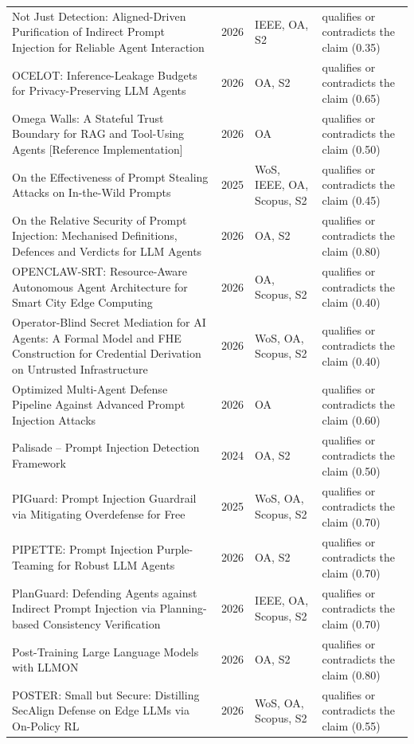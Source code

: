 \begin{longtable}{@{}%
  >{\raggedright\arraybackslash}p{}c%
  >{\raggedright\arraybackslash}p{}%
  >{\raggedright\arraybackslash}p{}@{}}
Not Just Detection: Aligned-Driven Purification of Indirect Prompt Injection for Reliable Agent Interaction & 2026 & IEEE, OA, S2 & qualifies or contradicts the claim (0.35) \\
OCELOT: Inference-Leakage Budgets for Privacy-Preserving LLM Agents & 2026 & OA, S2 & qualifies or contradicts the claim (0.65) \\
Omega Walls: A Stateful Trust Boundary for RAG and Tool-Using Agents [Reference Implementation] & 2026 & OA & qualifies or contradicts the claim (0.50) \\
On the Effectiveness of Prompt Stealing Attacks on In-the-Wild Prompts & 2025 & WoS, IEEE, OA, Scopus, S2 & qualifies or contradicts the claim (0.45) \\
On the Relative Security of Prompt Injection: Mechanised Definitions, Defences and Verdicts for LLM Agents & 2026 & OA, S2 & qualifies or contradicts the claim (0.80) \\
OPENCLAW-SRT: Resource-Aware Autonomous Agent Architecture for Smart City Edge Computing & 2026 & OA, Scopus, S2 & qualifies or contradicts the claim (0.40) \\
Operator-Blind Secret Mediation for AI Agents: A Formal Model and FHE Construction for Credential Derivation on Untrusted Infrastructure & 2026 & WoS, OA, Scopus, S2 & qualifies or contradicts the claim (0.40) \\
Optimized Multi-Agent Defense Pipeline Against Advanced Prompt Injection Attacks & 2026 & OA & qualifies or contradicts the claim (0.60) \\
Palisade -- Prompt Injection Detection Framework & 2024 & OA, S2 & qualifies or contradicts the claim (0.50) \\
PIGuard: Prompt Injection Guardrail via Mitigating Overdefense for Free & 2025 & WoS, OA, Scopus, S2 & qualifies or contradicts the claim (0.70) \\
PIPETTE: Prompt Injection Purple-Teaming for Robust LLM Agents & 2026 & OA, S2 & qualifies or contradicts the claim (0.70) \\
PlanGuard: Defending Agents against Indirect Prompt Injection via Planning-based Consistency Verification & 2026 & IEEE, OA, Scopus, S2 & qualifies or contradicts the claim (0.70) \\
Post-Training Large Language Models with LLMON & 2026 & OA, S2 & qualifies or contradicts the claim (0.80) \\
POSTER: Small but Secure: Distilling SecAlign Defense on Edge LLMs via On-Policy RL & 2026 & WoS, OA, Scopus, S2 & qualifies or contradicts the claim (0.55) \\

\end{longtable}
